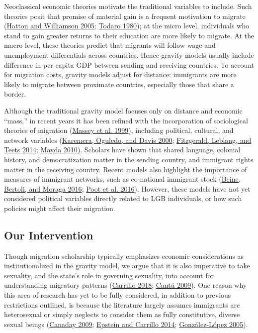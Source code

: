 \documentclass[
  11pt,
]{article}
\begin{document}
Neoclassical economic theories motivate the traditional variables to include. Such theories posit that promise of material gain is a frequent motivation to migrate (\protect\hyperlink{ref-hatton_2005a}{Hatton and Williamson 2005}; \protect\hyperlink{ref-todaro_1980}{Todaro 1980}); at the micro level, individuals who stand to gain greater returns to their education are more likely to migrate. At the macro level, these theories predict that migrants will follow wage and unemployment differentials across countries. Hence gravity models usually include difference in per capita GDP between sending and receiving countries. To account for migration costs, gravity models adjust for distance: immigrants are more likely to migrate between proximate countries, especially those that share a border.

Although the traditional gravity model focuses only on distance and economic ``mass,'' in recent years it has been refined with the incorporation of sociological theories of migration (\protect\hyperlink{ref-massey_1999}{Massey et al. 1999}), including political, cultural, and network variables (\protect\hyperlink{ref-karemera_2000}{Karemera, Oguledo, and Davis 2000}; \protect\hyperlink{ref-fitzgerald_2014}{Fitzgerald, Leblang, and Teets 2014}; \protect\hyperlink{ref-mayda_2010}{Mayda 2010}). Scholars have shown that shared language, colonial history, and democratization matter in the sending country, and immigrant rights matter in the receiving country. Recent models also highlight the importance of measures of immigrant networks, such as co-national immigrant stock (\protect\hyperlink{ref-beine_2016}{Beine, Bertoli, and Moraga 2016}; \protect\hyperlink{ref-poot_2016}{Poot et al. 2016}). However, these models have not yet considered political variables directly related to LGB individuals, or how such policies might affect their migration.

\hypertarget{our-intervention}{%
\subsection{Our Intervention}\label{our-intervention}}

Though migration scholarship typically emphasizes economic considerations as institutionalized in the gravity model, we argue that it is also imperative to take sexuality, and the state's role in governing sexuality, into account for understanding migratory patterns (\protect\hyperlink{ref-carrillo_2018}{Carrillo 2018}; \protect\hyperlink{ref-cantu_2009}{Cantú 2009}). One reason why this area of research has yet to be fully considered, in addition to previous restrictions outlined, is because the literature largely assumes immigrants are heterosexual or simply neglects to consider them as fully constitutive, diverse sexual beings (\protect\hyperlink{ref-canaday_2009}{Canaday 2009}; \protect\hyperlink{ref-epstein_2014}{Epstein and Carrillo 2014}; \protect\hyperlink{ref-gonzalez-lopez_2005}{González-López 2005}).
\end{document}
